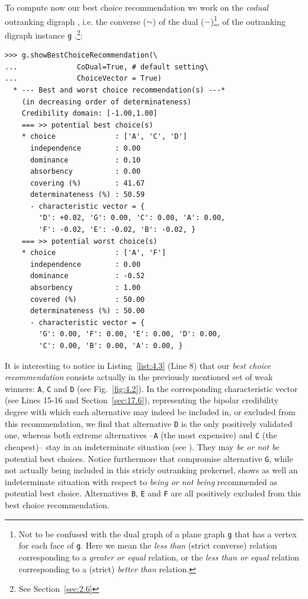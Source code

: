 To compute now our \Rubis best choice recommendation we work on the \emph{codual} outranking digraph , i.e. the converse ($\sim$) of the dual ($-$)\footnote{Not to be confused with the dual graph of a plane graph \texttt{g} that has a vertex for each face of \texttt{g}. Here we mean the \emph{less than} (strict converse) relation corresponding to a \emph{greater or equal} relation, or the \emph{less than or equal} relation corresponding to a (strict) \emph{better than} relation.}, of the outranking digraph instance \texttt{g} \citep{BIS-2013}.\footnote{See Section~\ref{sec:2.6}}:
\begin{lstlisting}[caption={Computing the best choice recommendation},label=list:4.3]
>>> g.showBestChoiceRecommendation(\
...              CoDual=True, # default setting\
...              ChoiceVector = True)   
  * --- Best and worst choice recommendation(s) ---*
    (in decreasing order of determinateness)   
    Credibility domain: [-1.00,1.00]
    === >> potential best choice(s)
    * choice              : ['A', 'C', 'D']
      independence        : 0.00
      dominance           : 0.10
      absorbency          : 0.00
      covering (%)        : 41.67
      determinateness (%) : 50.59
      - characteristic vector = {
        'D': +0.02, 'G': 0.00, 'C': 0.00, 'A': 0.00,
        'F': -0.02, 'E': -0.02, 'B': -0.02, }
    === >> potential worst choice(s) 
    * choice              : ['A', 'F']
      independence        : 0.00
      dominance           : -0.52
      absorbency          : 1.00
      covered (%)         : 50.00
      determinateness (%) : 50.00
      - characteristic vector = {
        'G': 0.00, 'F': 0.00, 'E': 0.00, 'D': 0.00,
        'C': 0.00, 'B': 0.00, 'A': 0.00, }
\end{lstlisting}				  
It is interesting to notice in Listing~\ref{list:4.3} (Line 8) that our \emph{best choice recommendation} consists actually in the previously mentioned set of weak \Condorcet winners: \texttt{A}, \texttt{C} and \texttt{D} (see Fig.~\ref{fig:4.2}). In the corresponding characteristic vector (see Lines 15-16 and Section~\ref{sec:17.6}), representing the bipolar credibility degree with which each alternative may indeed be included in, or excluded from this recommendation, we find that alternative \texttt{D} is the only positively validated one, whereas both extreme alternatives --\texttt{A} (the most expensive) and \texttt{C} (the cheapest)-- stay in an indeterminate situation (see \citet{BIS-2006a,BIS-2006b}). They may \emph{be or not be} potential best choices. Notice furthermore that compromise alternative \texttt{G}, while not actually being included in this stricly outranking prekernel, shows as well an indeterminate situation with respect to \emph{being or not being} recommended as potential best choice. Alternatives \texttt{B}, \texttt{E} and \texttt{F} are all positively excluded from this best choice recommendation.


